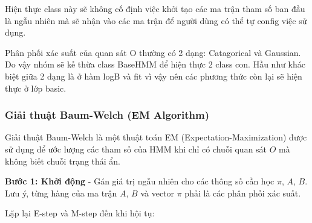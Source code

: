 \documentclass[twoside, final]{hcmut_report}
\begin{document}
Hiện thực class này sẽ không cố định việc khởi tạo các ma trận tham số ban đầu là ngẫu nhiên mà sẽ nhận vào các ma trận để người dùng có thể tự config việc sử dụng.

Phân phối xác suất của quan sát O thường có 2 dạng: Catagorical và Gaussian. Do vậy nhóm sẽ kế thừa class BaseHMM để hiện thực 2 class con. Hầu như khác biệt giữa 2 dạng là ở hàm logB và fit vì vậy nên các phương thức còn lại sẽ hiện thực ở lớp basic.

\subsubsection*{Giải thuật Baum-Welch (EM Algorithm)}

Giải thuật Baum-Welch là một thuật toán EM (Expectation-Maximization) được sử dụng để ước lượng các tham số của HMM khi chỉ có chuỗi quan sát $O$ mà không biết chuỗi trạng thái ẩn.

\textbf{Bước 1: Khởi động} - Gán giá trị ngẫu nhiên cho các thông số cần học $\pi$, $A$, $B$. Lưu ý, từng hàng của ma trận $A$, $B$ và vector $\pi$ phải là các phân phối xác suất. 

Lặp lại E-step và M-step đến khi hội tụ:
\end{document}
